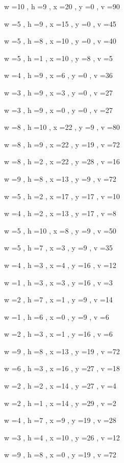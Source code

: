 \documentclass[11pt]{article}
\begin{document}
w =10 , h =9 , x =20 , y =0 , v =90
\par
w =5 , h =9 , x =15 , y =0 , v =45
\par
w =5 , h =8 , x =10 , y =0 , v =40
\par
w =5 , h =1 , x =10 , y =8 , v =5
\par
w =4 , h =9 , x =6 , y =0 , v =36
\par
w =3 , h =9 , x =3 , y =0 , v =27
\par
w =3 , h =9 , x =0 , y =0 , v =27
\par
w =8 , h =10 , x =22 , y =9 , v =80
\par
w =8 , h =9 , x =22 , y =19 , v =72
\par
w =8 , h =2 , x =22 , y =28 , v =16
\par
w =9 , h =8 , x =13 , y =9 , v =72
\par
w =5 , h =2 , x =17 , y =17 , v =10
\par
w =4 , h =2 , x =13 , y =17 , v =8
\par
w =5 , h =10 , x =8 , y =9 , v =50
\par
w =5 , h =7 , x =3 , y =9 , v =35
\par
w =4 , h =3 , x =4 , y =16 , v =12
\par
w =1 , h =3 , x =3 , y =16 , v =3
\par
w =2 , h =7 , x =1 , y =9 , v =14
\par
w =1 , h =6 , x =0 , y =9 , v =6
\par
w =2 , h =3 , x =1 , y =16 , v =6
\par
w =9 , h =8 , x =13 , y =19 , v =72
\par
w =6 , h =3 , x =16 , y =27 , v =18
\par
w =2 , h =2 , x =14 , y =27 , v =4
\par
w =2 , h =1 , x =14 , y =29 , v =2
\par
w =4 , h =7 , x =9 , y =19 , v =28
\par
w =3 , h =4 , x =10 , y =26 , v =12
\par
w =9 , h =8 , x =0 , y =19 , v =72
\par
\newpage


\end{document}
